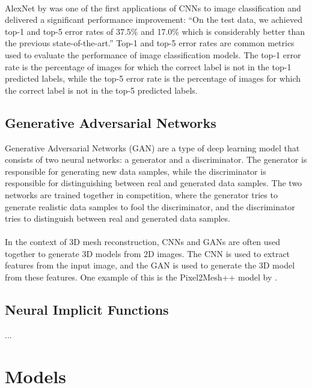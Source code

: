 \paragraph{}
AlexNet by \textcite{krizhevsky_imagenet_2012} was one of the first applications of CNNs to image classification and delivered a significant performance improvement: “On the test data, we achieved top-1 and top-5 error rates of 37.5\% and 17.0\% which is considerably better than the previous state-of-the-art.” \autocite{krizhevsky_imagenet_2012}
Top-1 and top-5 error rates are common metrics used to evaluate the performance of image classification models. The top-1 error rate is the percentage of images for which the correct label is not in the top-1 predicted labels, while the top-5 error rate is the percentage of images for which the correct label is not in the top-5 predicted labels.

\subsection{Generative Adversarial Networks}
Generative Adversarial Networks (GAN) \autocite{goodfellow_generative_2014} are a type of deep learning model that consists of two neural networks: a generator and a discriminator. The generator is responsible for generating new data samples, while the discriminator is responsible for distinguishing between real and generated data samples. The two networks are trained together in competition, where the generator tries to generate realistic data samples to fool the discriminator, and the discriminator tries to distinguish between real and generated data samples.
\paragraph{}
In the context of 3D mesh reconstruction, CNNs and GANs are often used together to generate 3D models from 2D images. The CNN is used to extract features from the input image, and the GAN is used to generate the 3D model from these features. One example of this is the Pixel2Mesh++ model by \textcite{wen_pixel2mesh_2019}.

\subsection{Neural Implicit Functions}
...
\textcite{park_deepsdf_2019}
\textcite{mildenhall_nerf_2021}

\section{Models}

